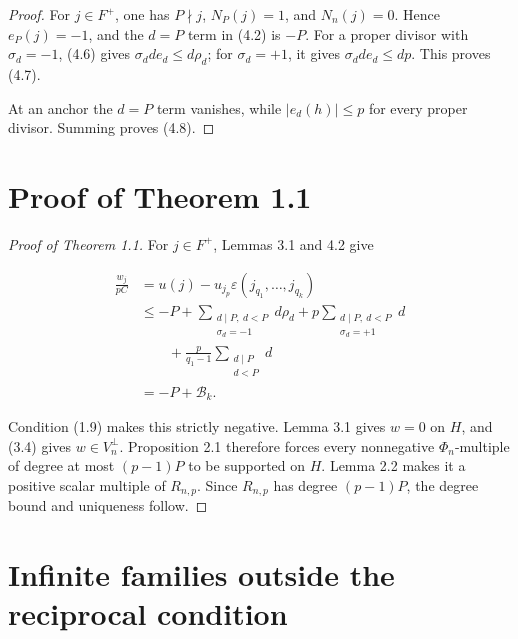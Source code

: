 \documentclass[11pt]{article}
\numberwithin{equation}{section}
\begin{document}
\begin{proof}

For \(j\in F^+\), one has \(P\nmid j\), \(N_P(j)=1\), and
\(N_n(j)=0\). Hence \(e_P(j)=-1\), and the \(d=P\) term in (4.2)
is \(-P\). For a proper divisor with \(\sigma_d=-1\), (4.6) gives
\(\sigma_dd e_d\leq d\rho_d\); for \(\sigma_d=+1\), it gives
\(\sigma_dd e_d\leq dp\). This proves (4.7).

At an anchor the \(d=P\) term vanishes, while
\(|e_d(h)|\leq p\) for every proper divisor. Summing proves (4.8).
\end{proof}


\section{Proof of Theorem 1.1}

\begin{proof}[Proof of Theorem 1.1]

For \(j\in F^+\), Lemmas 3.1 and 4.2 give

\nopagebreak[4]
\[
\begin{aligned}
\frac{w_j}{pC}
&=u(j)-u_{j_p}\varepsilon(j_{q_1},\ldots,j_{q_k})\\
&\leq
-P+
\sum_{\substack{d\mid P,\ d<P\\ \sigma_d=-1}}d\rho_d
+p\sum_{\substack{d\mid P,\ d<P\\ \sigma_d=+1}}d\\
&\qquad
+\frac{p}{q_1-1}
\sum_{\substack{d\mid P\\d<P}}d\\
&=-P+\mathcal B_k.
\end{aligned}
\tag{5.1}
\]

Condition (1.9) makes this strictly negative. Lemma 3.1 gives \(w=0\)
on \(H\), and (3.4) gives \(w\in V_n^\perp\). Proposition 2.1 therefore
forces every nonnegative \(\Phi_n\)-multiple of degree at most
\((p-1)P\) to be supported on \(H\). Lemma 2.2 makes it a positive
scalar multiple of \(R_{n,p}\). Since \(R_{n,p}\) has degree
\((p-1)P\), the degree bound and uniqueness follow.
\end{proof}


\section{Infinite families outside the reciprocal condition}
\end{document}
